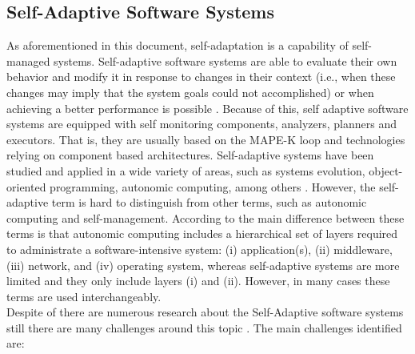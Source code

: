 \subsection {Self-Adaptive Software Systems}
As aforementioned in this document, self-adaptation is a capability of self-managed systems. Self-adaptive software systems are able to evaluate their own behavior and modify it in response to changes in their context (i.e., when these changes may imply that the system goals could not accomplished) or when achieving a better performance is possible \cite{tamura-et-al:2014:QoS-Contract-Preservation}\cite{villegas-et-al:2011:on-designing}. Because of this, self adaptive software systems are equipped with self monitoring components, analyzers, planners and executors. That is, they are usually based on the MAPE-K loop and technologies relying on component based architectures. Self-adaptive systems have been studied and applied in a wide variety of areas, such as systems evolution, object-oriented programming, autonomic computing, among others \cite{SEFSAS3:2017:what-can-control}\cite{villegas-et-al:2017-architecting-SwSystems-for-self-adaptation}\cite{Munoz-et-al:2015:refas-splc}\cite{Munoz-et-al:2015:variamos-splc}. However, the self-adaptive term is hard to distinguish from other terms, such as autonomic computing and self-management. According to \cite{Salehie:2009:SSL:1516533.1516538} the main difference between these terms is that autonomic computing includes a hierarchical set of layers required to administrate a software-intensive system: (i) application(s), (ii) middleware, (iii) network, and (iv) operating system, whereas self-adaptive systems are more limited and they only include layers (i) and (ii). However, in many cases these terms are used interchangeably.\\

Despite of there are numerous research about the Self-Adaptive software systems still there are many challenges around this topic \cite{de2013software}. The main challenges identified are:

